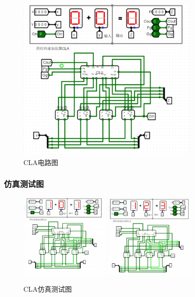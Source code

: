\documentclass{article}
\begin{document}
    \begin{figure}[H]
    \centering
    \includegraphics[width=0.8\textwidth]{2.4.2.png}
    \caption{CLA电路图}
    \end{figure}

    \subsubsection{仿真测试图}
    \begin{figure}[H]
    \centering
    \includegraphics[width=0.4\textwidth]{2.5.1.png}
    \includegraphics[width=0.4\textwidth]{2.5.2.png}
    \caption{CLA仿真测试图}
    \end{figure}
\end{document}
